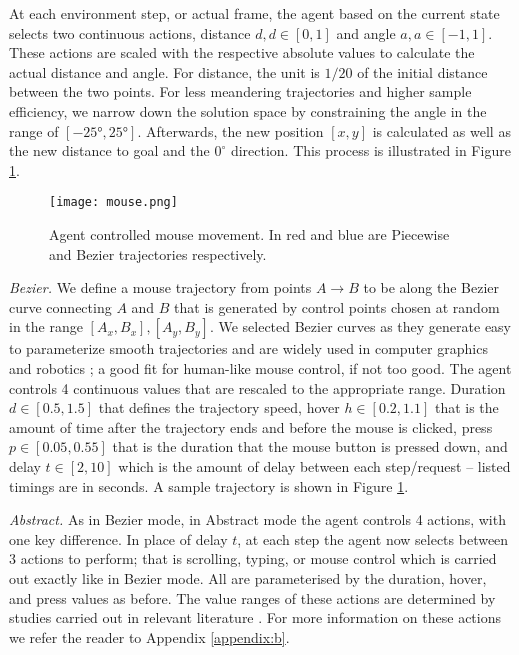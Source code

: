 At each environment step, or actual frame, the agent based on the current state selects two continuous actions, distance $d, d \in [0,1]$ and angle $a, a \in [-1,1]$.
These actions are scaled with the respective absolute values to calculate the actual distance and angle.
For distance, the unit is $1/20$ of the initial distance between the two points.
For less meandering trajectories and higher sample efficiency, we narrow down the solution space by constraining the angle in the range of $[\ang{-25}, \ang{25}]$.
Afterwards, the new position $[x,y]$ is calculated as well as the new distance to goal and the $0^{\circ}$ direction.
This process is illustrated in Figure \ref{mouse}.

\begin{figure}
\centerline{\texttt{[image: mouse.png]}}
\caption{Agent controlled mouse movement. In red and blue are Piecewise and Bezier trajectories respectively.}
\label{mouse}
\end{figure}

\emph{Bezier.} We define a mouse trajectory from points $A \rightarrow B$ to be along the Bezier curve connecting $A$ and $B$ that is generated by control points chosen at random in the range $[A_x,B_x], [A_y,B_y]$.
We selected Bezier curves as they generate easy to parameterize smooth trajectories and are widely used in computer graphics and robotics \cite{tharwat2019intelligent, wang2020using}; a good fit for human-like mouse control, if not too good.
The agent controls 4 continuous values that are rescaled to the appropriate range.
Duration $d \in [0.5,1.5]$ that defines the trajectory speed, hover $h \in [0.2,1.1]$ that is the amount of time after the trajectory ends and before the mouse is clicked, press $p \in [0.05,0.55]$ that is the duration that the mouse button is pressed down, and delay $t \in [2,10]$ which is the amount of delay between each step/request -- listed timings are in seconds.
A sample trajectory is shown in Figure \ref{mouse}.

\emph{Abstract.} As in Bezier mode, in Abstract mode the agent controls 4 actions, with one key difference.
In place of delay $t$, at each step the agent now selects between 3 actions to perform; that is scrolling, typing, or mouse control which is carried out exactly like in Bezier mode.
All are parameterised by the duration, hover, and press values as before.
The value ranges of these actions are determined by studies carried out in relevant literature \cite{dhakal2018observations, katerina2018mouse}.
For more information on these actions we refer the reader to Appendix \ref{appendix:b}.

